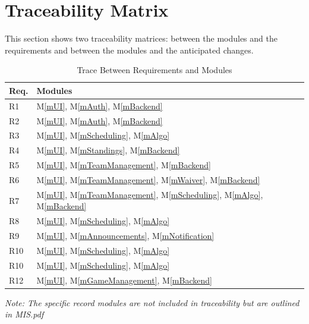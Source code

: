 \documentclass[12pt, titlepage]{article}
\newcommand{\mref}[1]{M\ref{#1}}
\begin{document}
\section{Traceability Matrix} \label{SecTM}

This section shows two traceability matrices: between the modules and the
requirements and between the modules and the anticipated changes.

\begin{table}[H]
\centering
\begin{tabular}{p{} p{}}
\toprule
\textbf{Req.} & \textbf{Modules}\\
\midrule
R1 & \mref{mUI}, \mref{mAuth}, \mref{mBackend}\\
R2 & \mref{mUI}, \mref{mAuth}, \mref{mBackend}\\
R3 & \mref{mUI}, \mref{mScheduling}, \mref{mAlgo}\\
R4 & \mref{mUI}, \mref{mStandings}, \mref{mBackend}\\
R5 & \mref{mUI}, \mref{mTeamManagement}, \mref{mBackend}\\
R6 & \mref{mUI}, \mref{mTeamManagement}, \mref{mWaiver}, \mref{mBackend}\\
R7 & \mref{mUI}, \mref{mTeamManagement}, \mref{mScheduling}, \mref{mAlgo}, \mref{mBackend}\\
R8 & \mref{mUI}, \mref{mScheduling}, \mref{mAlgo}\\
R9 & \mref{mUI}, \mref{mAnnouncements}, \mref{mNotification}\\
R10 & \mref{mUI}, \mref{mScheduling}, \mref{mAlgo}\\
R10 & \mref{mUI}, \mref{mScheduling}, \mref{mAlgo}\\
R12 & \mref{mUI}, \mref{mGameManagement}, \mref{mBackend}\\
\bottomrule
\end{tabular}
\caption{Trace Between Requirements and Modules}
\textit{Note: The specific record modules are not included in traceability but are outlined in MIS.pdf}
\label{TblRT}
\end{table}
\end{document}
